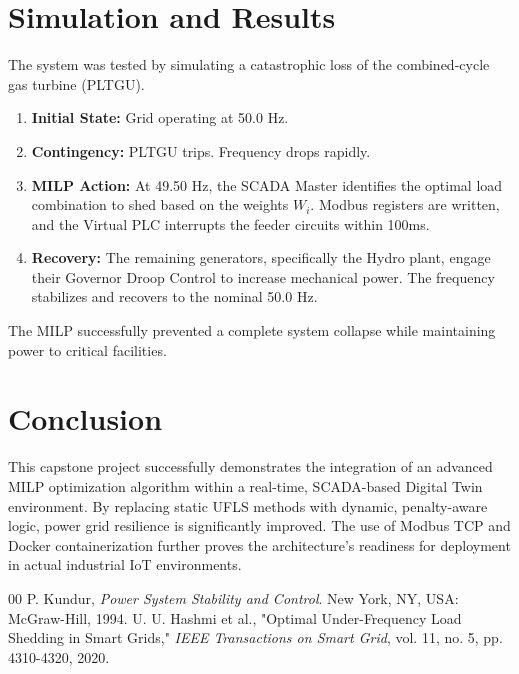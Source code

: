 \documentclass[conference]{IEEEtran}
\begin{document}
\section{Simulation and Results}
The system was tested by simulating a catastrophic loss of the combined-cycle gas turbine (PLTGU). 
\begin{enumerate}
\item \textbf{Initial State:} Grid operating at 50.0 Hz.
\item \textbf{Contingency:} PLTGU trips. Frequency drops rapidly.
\item \textbf{MILP Action:} At 49.50 Hz, the SCADA Master identifies the optimal load combination to shed based on the weights $W_i$. Modbus registers are written, and the Virtual PLC interrupts the feeder circuits within 100ms.
\item \textbf{Recovery:} The remaining generators, specifically the Hydro plant, engage their Governor Droop Control to increase mechanical power. The frequency stabilizes and recovers to the nominal 50.0 Hz.
\end{enumerate}
The MILP successfully prevented a complete system collapse while maintaining power to critical facilities.

\section{Conclusion}
This capstone project successfully demonstrates the integration of an advanced MILP optimization algorithm within a real-time, SCADA-based Digital Twin environment. By replacing static UFLS methods with dynamic, penalty-aware logic, power grid resilience is significantly improved. The use of Modbus TCP and Docker containerization further proves the architecture's readiness for deployment in actual industrial IoT environments.

\begin{thebibliography}{00}
 P. Kundur, \textit{Power System Stability and Control}. New York, NY, USA: McGraw-Hill, 1994.
 U. U. Hashmi et al., "Optimal Under-Frequency Load Shedding in Smart Grids," \textit{IEEE Transactions on Smart Grid}, vol. 11, no. 5, pp. 4310-4320, 2020.
\end{thebibliography}
\end{document}
